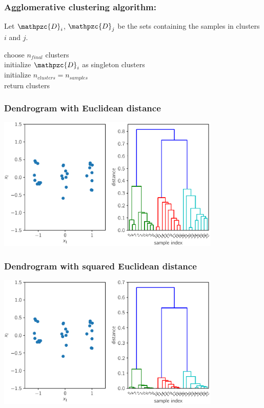 \documentclass[Nike]{tuberlinbeamer}
\begin{document}
\begin{frame}
  \frametitle{Agglomerative clustering algorithm:}
  Let $\mathpzc{D}_i$, $\mathpzc{D}_j$ be the sets containing the samples in clusters $i$ and $j$.  \\
  \bigskip

  choose $n_{final}$ clusters\\
  initialize $\mathpzc{D}_i$ as singleton clusters\\
  initialize $n_{clusters} = n_{samples}$\\
  return clusters
\end{frame}

\begin{frame}
  \frametitle{Dendrogram with Euclidean distance}
  \begin{center}
    \centering\includegraphics[width=0.8\textwidth]{dendrogram_euclidean.pdf}
  \end{center}
\end{frame}

\begin{frame}
  \frametitle{Dendrogram with squared Euclidean distance}
  \begin{center}
    \centering\includegraphics[width=0.8\textwidth]{dendrogram_squared_euclidean.pdf}
  \end{center}
\end{frame}
\end{document}
